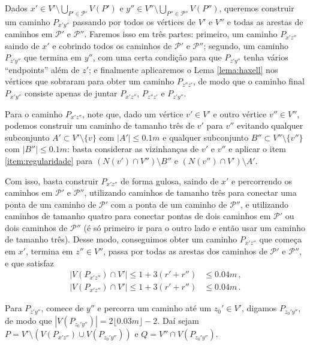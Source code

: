 \begin{dem}
	Dados $x'\in V'\setminus\bigcup_{P'\in \mathcal{P}'}V(P')$ e $y''\in V''\setminus\bigcup_{P''\in \mathcal{P}''}V(P'')$, queremos construir um caminho $P_{x'y''}$ passando por todos os vértices de $V'$ e $V''$ e todas as arestas de caminhos em $\mathcal{P}'$ e $\mathcal{P}''$. Faremos isso em três partes: primeiro, um caminho $P_{x'z''}$ saindo de $x'$ e cobrindo todos os caminhos de $\mathcal{P}'$ e $\mathcal{P}''$; segundo, um caminho $P_{z'y''}$ que termina em $y''$, com uma certa condição para que $P_{z'y''}$ tenha vários ``endpoints'' além de $z'$; e finalmente aplicaremos o Lema \ref{lema:haxell} nos vértices que sobraram para obter um caminho $P_{z''z'}$, de modo que o caminho final $P_{x'y''}$ consiste apenas de juntar $P_{x'z''}$, $P_{z''z'}$ e $P_{z'y''}$.
	
	Para o caminho $P_{x'z''}$, note que, dado um vértice $v'\in V'$ e outro vértice $v''\in V''$, podemos construir um caminho de tamanho três de $v'$ para $v''$ evitando qualquer subconjunto $A'\subset V'\setminus\{v\}$ com $|A'|\leq0.1m$ e qualquer subconjunto $B''\subset V''\setminus\{v''\}$ com $|B''|\leq0.1m$: basta considerar as vizinhanças de $v'$ e $v''$ e aplicar o item \ref{item:regularidade} para $(N(v')\cap V'')\setminus B''$ e $(N(v'')\cap V')\setminus A'$.
	
	Com isso, basta construir $P_{x'z''}$ de forma gulosa, saindo de $x'$ e percorrendo os caminhos em $\mathcal{P}'$ e $\mathcal{P}''$, utilizando caminhos de tamanho três para conectar uma ponta de um caminho de $\mathcal{P}'$ com a ponta de um caminho de $\mathcal{P}''$, e utilizando caminhos de tamanho quatro para conectar pontas de dois caminhos em $\mathcal{P}'$ ou dois caminhos de $\mathcal{P}''$ (é só primeiro ir para o outro lado e então usar um caminho de tamanho três). Desse modo, conseguimos obter um caminho $P_{x'z''}$ que começa em $x'$, termina em $z''\in V''$, passa por todas as arestas dos caminhos de $\mathcal{P}'$ e $\mathcal{P}''$, e que satisfaz
	\begin{align*}
	|V(P_{x'z''})\cap V'|\leq 1 + 3(r' + r'')&\leq 0.04m \,,\\
	|V(P_{x'z''})\cap V'|\leq 1 + 3(r' + r'')&\leq 0.04m \,.
	\end{align*}
	
	Para $P_{z'y''}$, comece de $y''$ e percorra um caminho até um $z_0'\in V'$, digamos $P_{z_0'y''}$, de modo que $|V(P_{z_0'y''})| = 2\lfloor0.03m\rfloor - 2$. Daí sejam $P = V'\setminus (V(P_{x'z''})\cup V(P_{z_0'y''}))$ e $Q = V''\cap V(P_{z_0'y''})$.
	

\end{dem}
